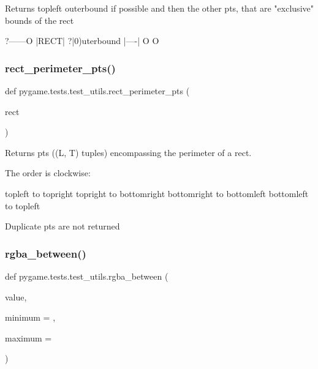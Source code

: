\begin{DoxyVerb}Returns topleft outerbound if possible and then the other pts, that are 
"exclusive" bounds of the rect
    
   ?------O     
|RECT|      ?|0)uterbound
|----|     
   O      O\end{DoxyVerb}
 \mbox{\label{namespacepygame_1_1tests_1_1test__utils_a891def05e6d256b4680847590bab1f0f}} 
\subsubsection{\texorpdfstring{rect\+\_\+perimeter\+\_\+pts()}{rect\_perimeter\_pts()}}
{\footnotesize\ttfamily def pygame.\+tests.\+test\+\_\+utils.\+rect\+\_\+perimeter\+\_\+pts (\begin{DoxyParamCaption}\item[{}]{rect }\end{DoxyParamCaption})}

\begin{DoxyVerb}Returns pts ((L, T) tuples) encompassing the perimeter of a rect.

The order is clockwise:

      topleft to topright
     topright to bottomright
  bottomright to bottomleft
   bottomleft to topleft

Duplicate pts are not returned\end{DoxyVerb}
 \mbox{\label{namespacepygame_1_1tests_1_1test__utils_addfe65a243af08a27726e75773883a1e}} 
\subsubsection{\texorpdfstring{rgba\+\_\+between()}{rgba\_between()}}
{\footnotesize\ttfamily def pygame.\+tests.\+test\+\_\+utils.\+rgba\+\_\+between (\begin{DoxyParamCaption}\item[{}]{value,  }\item[{}]{minimum = {},  }\item[{}]{maximum = {} }\end{DoxyParamCaption})}



